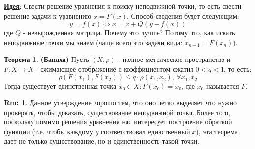 \documentclass[12pt]{article}
\theoremstyle{definition}
\newtheorem{rem}{Rm:}
\newtheorem{theorem}{Теорема}
\begin{document}
\textbf{\uline{Идея}}: Свести решение уравнения к поиску неподвижной точки, то есть свести решение задачи к уравнению $x = F(x)$. Способ сведения будет следующим:
$$
	y = f(x) \Leftrightarrow x = x + Q(y - f(x))
$$
где $Q$ - невырожденная матрица. Почему это лучше? Потому что, как искать неподвижные точки мы знаем (чаще всего это задачи вида: $x_{n+1} = F(x_n)$).
\begin{theorem}
	\textbf{(Банаха)} Пусть $(X,\rho)$ - полное метрическое пространство и $F \colon X \to X$ - сжимающее отображение с коэффициентом сжатия $0 < q < 1$, то есть:
	$$
		\rho(F(x_1),F(x_2)) \leq q{\cdot}\rho(x_1,x_2), \, \forall x_1, x_2
	$$
	Тогда существует единственная точка $x_0 \in X \colon F(x_0) = x_0$, где $x_0$ называется  $F$. 
\end{theorem}
\begin{rem}
	Данное утверждение хорошо тем, что оно четко выделяет что нужно проверять, чтобы доказать, существование неподвижной точки. Более того, поскольку помимо решения уравнения нас интересует построение обратной функции (т.е. чтобы каждому $y$ соответствовал единственный $x$), эта теорема дает не только существование, но и единственность такой точки.
\end{rem}
\end{document}
